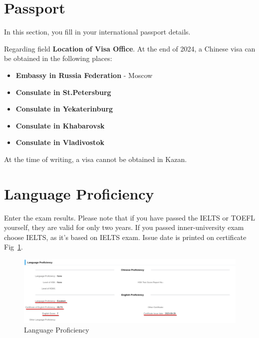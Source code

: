 \section{Passport}

In this section, you fill in your international passport details.

Regarding field \textbf{Location of Visa Office}.
At the end of 2024, a Chinese visa can be obtained in the following places:

\begin{itemize}
    \item \textbf{Embassy in Russia Federation} - Moscow
    \item \textbf{Consulate in St.Petersburg}
    \item \textbf{Consulate in Yekaterinburg}
    \item \textbf{Consulate in Khabarovsk}
    \item \textbf{Consulate in Vladivostok}
\end{itemize}


\begin{tcolorbox}[colback=yellow!10, colframe=yellow!80!black, title=Note]
    At the time of writing, a visa cannot be obtained in Kazan.
\end{tcolorbox}


\section{Language Proficiency}
Enter the exam results.
Please note that if you have passed the IELTS or TOEFL yourself,
they are valid for only two years.
If you passed inner-university exam choose IELTS, as it's based on IELTS exam.
Issue date is printed on certificate Fig~\ref{fig:ru_lang_prof}.


\begin{figure}[H]
    \centering
    \includegraphics[width=\textwidth]{russia/imgs/app_5_language}
    \caption{\centering Language Proficiency}
    \label{fig:ru_lang_prof}
\end{figure}



